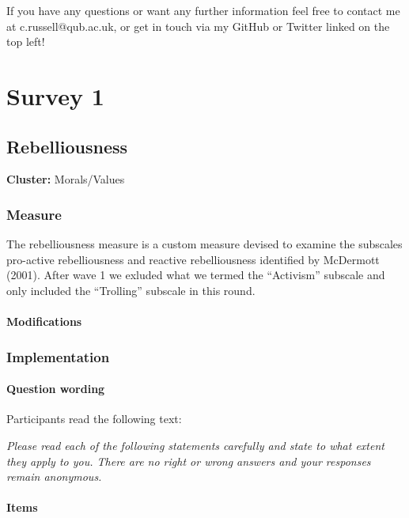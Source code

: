 \documentclass[
  letterpaper,
]{scrbook}
\begin{document}
If you have any questions or want any further information feel free to
contact me at c.russell@qub.ac.uk, or get in touch via my GitHub or
Twitter linked on the top left!

\part{Survey 1}

\chapter{Rebelliousness}\label{rebelliousness}

\textbf{Cluster:} Morals/Values

\section{Measure}\label{measure}

The rebelliousness measure is a custom measure devised to examine the
subscales pro-active rebelliousness and reactive rebelliousness
identified by McDermott (2001). After wave 1 we exluded what we termed
the ``Activism'' subscale and only included the ``Trolling'' subscale in
this round.

\subsection*{Modifications}\label{modifications}

\section{Implementation}\label{implementation}

\subsection*{Question wording}\label{question-wording}

Participants read the following text:

\emph{Please read each of the following statements carefully and state
to what extent they apply to you. There are no right or wrong answers
and your responses remain anonymous.}

\subsection*{Items}\label{items}
\end{document}
